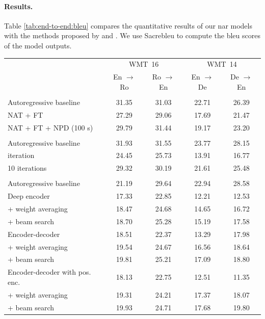 

\paragraph{Results.} Table \ref{tab:end-to-end:bleu} compares the quantitative
results of our \ac{nar} models with the methods proposed by
\citet{gu2017nonautoregressive} and \citet{lee-etal-2018-deterministic}. We use
Sacrebleu \citep{post-2018-call} to compute the \acs{bleu} scores of the model
outputs.

\begin{table}
  \centering
  \begin{tabular}{lcccc}
    \toprule
     & \multicolumn{2}{c}{WMT~16} & \multicolumn{2}{c}{WMT~14} \\
     & En $\rightarrow$ Ro & Ro $\rightarrow$ En & En $\rightarrow$ De & De $\rightarrow$ En \\
    \midrule
    \citet{gu2017nonautoregressive} & & & & \\
    Autoregressive baseline & 31.35 & 31.03 & 22.71 & 26.39 \\
    \addlinespace
    NAT + FT & 27.29 & 29.06 & 17.69 & 21.47 \\
    NAT + FT + NPD (100 s) & 29.79 & 31.44 & 19.17 & 23.20 \\
    \midrule
    \citet{lee-etal-2018-deterministic} & & & & \\
    Autoregressive baseline & 31.93 & 31.55  & 23.77 & 28.15 \\
    \addlinespace
    1 iteration & 24.45 & 25.73 & 13.91 & 16.77 \\
    10 iterations & 29.32 & 30.19 & 21.61 & 25.48 \\
    \midrule
    \citet{libovicky-helcl-2018-end} & & & & \\
    Autoregressive baseline & 21.19 & 29.64 & 22.94 & 28.58 \\
    \addlinespace
    Deep encoder & 17.33 & 22.85 & 12.21 & 12.53 \\
    \quad + weight averaging & 18.47 & 24.68 & 14.65 & 16.72 \\
    \quad + beam search & 18.70 & 25.28 & 15.19 & 17.58 \\
    \addlinespace
    Encoder-decoder  & 18.51 & 22.37 & 13.29 & 17.98 \\
    \quad + weight averaging & 19.54 & 24.67 & 16.56 & 18.64 \\
    \quad + beam search & 19.81 & 25.21 & 17.09 & 18.80  \\
    \addlinespace
    Encoder-decoder with pos. enc. & 18.13 & 22.75 & 12.51 & 11.35 \\
    \quad + weight averaging & 19.31 & 24.21 & 17.37 & 18.07 \\
    \quad + beam search & 19.93 & 24.71 & 17.68 & 19.80 \\
    \bottomrule
  \end{tabular}


\end{table}

